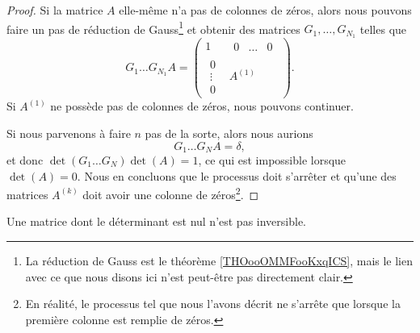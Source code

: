 \begin{proof}
    Si la matrice \( A\) elle-même n'a pas de colonnes de zéros, alors nous pouvons faire un pas de réduction de Gauss\footnote{La réduction de Gauss est le théorème \ref{THOooOMMFooKxqICS}, mais le lien avec ce que nous disons ici n'est peut-être pas directement clair.}
    et obtenir des matrices \( G_1,\ldots,  G_{N_1}\) telles que
    \begin{equation}
        G_1\ldots G_{N_1}A=
      \begin{pmatrix}
            1    &   \begin{matrix}
                0    &   \ldots    &   0
            \end{matrix}\\
            \begin{matrix}
                0    \\
                \vdots    \\
                0
            \end{matrix}& A^{(1)}
        \end{pmatrix}.
    \end{equation}
    Si \( A^{(1)}\) ne possède pas de colonnes de zéros, nous pouvons continuer.

    Si nous parvenons à faire \( n\) pas de la sorte, alors nous aurions
    \begin{equation}
        G_1\ldots G_NA=\delta,
    \end{equation}
    et donc \( \det(G_1\ldots G_N)\det(A)=1\), ce qui est impossible lorsque \( \det(A)=0\). Nous en concluons que le processus doit s'arrêter et qu'une des matrices \( A^{(k)}\) doit avoir une colonne de zéros\footnote{En réalité, le processus tel que nous l'avons décrit ne s'arrête que lorsque la première colonne est remplie de zéros.}.
\end{proof}

\begin{proposition}     \label{PROPooVUDJooLWjmSI}
    Une matrice dont le déterminant est nul n'est pas inversible.
\end{proposition}

